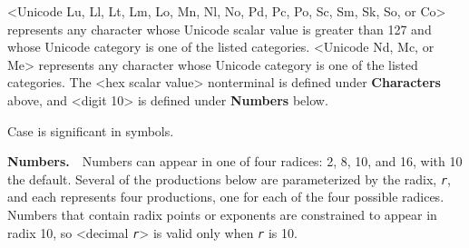 \textless{}Unicode Lu, Ll, Lt, Lm, Lo, Mn, Nl, No, Pd, Pc, Po, Sc, Sm, Sk, So,
or Co\textgreater{} represents any character whose Unicode scalar value is greater than
127 and whose Unicode category is one of the listed categories.
\textless{}Unicode Nd, Mc, or Me\textgreater{} represents any character whose Unicode
category is one of the listed categories.
The \textless{}hex scalar value\textgreater{} nonterminal is defined under \textbf{Characters} above,
and \textless{}digit 10\textgreater{} is defined under \textbf{Numbers} below.


Case is significant in symbols.


\textbf{Numbers\label{grammar_grammar_numbers}.}  \label{grammar_s18}Numbers can appear in one of four radices:
2, 8, 10, and 16, with 10 the default.
Several of the productions below are parameterized by the radix,
\texttt{\textit{r}}, and each represents four productions, one for each of the
four possible radices.
Numbers that contain radix points or exponents are constrained to
appear in radix
10, so \textless{}decimal \texttt{\textit{r}}\textgreater{} is valid only when \texttt{\textit{r}} is 10.


  
  
